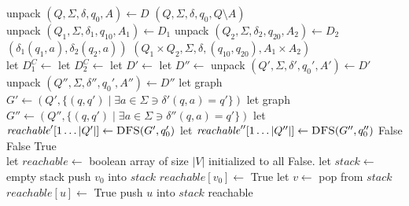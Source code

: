 \begin{soln}
\begin{algorithmic}[1]
\State {}
\State unpack $(Q, \Sigma, \delta, q_0, A) \gets D$
\State \Return $(Q, \Sigma, \delta, q_0, Q \setminus A)$
\EndFunction
\\
\State unpack $(Q_1, \Sigma, \delta_1, q_{10}, A_1) \gets D_1$
\State unpack $(Q_2, \Sigma, \delta_2, q_{20}, A_2) \gets D_2$
    \State \Return $(\delta_1(q_1, a), \delta_2(q_2, a))$
\EndFunction
\State \Return $(Q_1 \times Q_2, \Sigma, \delta, (q_{10}, q_{20}), A_1 \times A_2)$
\EndFunction
\\
\State let $D_1^C \gets$ 
\State let $D_2^C \gets$ 
\State let $D' \gets$ 
\State let $D'' \gets$ 
\State unpack $(Q', \Sigma, \delta', q_0', A') \gets D'$
\State unpack $(Q'', \Sigma, \delta'', q_0', A'') \gets D''$
\State {}
\State let graph $G' \gets (Q', \{(q, q') \mid \exists a \in \Sigma \ni \delta'(q, a) = q'\})$
\State let graph $G'' \gets (Q'', \{(q, q') \mid \exists a \in \Sigma \ni \delta''(q, a) = q'\})$
\State {}
\State let $\mathit{reachable}' [1 \ldots |Q'|] \gets \Call{DFS}{G', q_0'}$
\State let $\mathit{reachable}'' [1 \ldots |Q''|] \gets \Call{DFS}{G'', q_0''}$
        \State \Return False 
    \EndIf
\EndFor
{}
        \State \Return False 
    \EndIf
\EndFor
\State \Return True
\EndFunction
\\
    \State let $reachable \gets$ boolean array of size $|V|$ initialized to all False.
    \State let $stack \gets$ empty stack
    \State push $v_0$ into $stack$
    \State $reachable[v_0] \gets $ True
        \State let $v \gets$ pop from $stack$
                \State $reachable[u] \gets$ True
                \State push $u$ into $stack$
            \EndIf
        \EndFor
    \EndWhile
    \State \Return reachable
\EndFunction
\end{algorithmic}
\end{soln}
